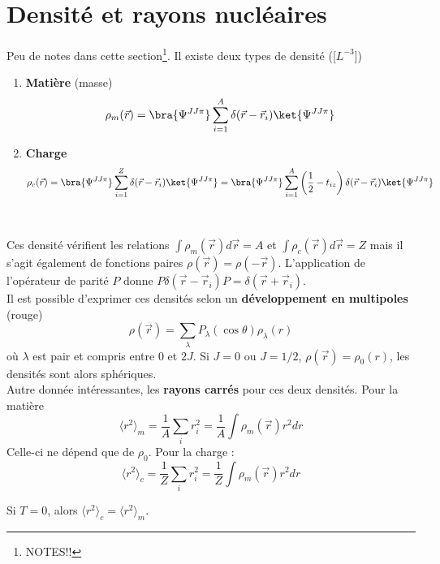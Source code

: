 \newpage
\section{Densité et rayons nucléaires}
Peu de notes dans cette section\footnote{NOTES!!}. Il existe deux types de densité ([$L^{-3}$])
\begin{enumerate}
\item \textbf{Matière} (masse)
\begin{equation}
\rho_m(\vec{r}) = \bra{\Psi^{JJ\pi}}\sum_{i=1}^A\delta(\vec{r}-\vec{r}_i)\ket{\Psi^{JJ\pi}}
\end{equation}
\item \textbf{Charge}
\begin{equation}
\rho_c(\vec{r}) = \bra{\Psi^{JJ\pi}}\sum_{i=1}^Z\delta(\vec{r}-\vec{r}_i)\ket{\Psi^{JJ\pi}} =
\bra{\Psi^{JJ\pi}}\sum_{i=1}^A\left( \frac{1}{2}-t_{iz} \right)\delta(\vec{r}-\vec{r}_i)\ket{\Psi^{JJ\pi}}
\end{equation}
\end{enumerate}\ 

Ces densité vérifient les relations $\int \rho_m(\vec{r})d\vec{r}=A$ et $\int \rho_c(\vec{r})d\vec{r}=Z$ mais
il s'agit également de fonctions paires $\rho(\vec{r})=\rho(-\vec{r})$. L'application de l'opérateur de 
parité $P$ donne $P\delta(\vec{r}-\vec{r}_i)P=\delta(\vec{r}+\vec{r}_i)$.\\

Il est possible d'exprimer ces densités selon un \textbf{développement en multipoles} (rouge)
\begin{equation}
\rho(\vec{r}) = \sum_\lambda P_\lambda(\cos\theta)\rho_\lambda(r)
\end{equation}
où $\lambda$ est pair et compris entre 0 et $2J$. Si $J=0$ ou $J=1/2$, $\rho(\vec{r})=\rho_0(r)$, les densités
sont alors sphériques. \\

Autre donnée intéressantes, les \textbf{rayons carrés} pour ces deux densités. Pour la matière
\begin{equation}
\langle r^2\rangle_m = \frac{1}{A}\sum_i r_i^2 = \frac{1}{A}\int \rho_m(\vec{r})r^2dr
\end{equation}
Celle-ci ne dépend que de $\rho_0$. Pour la charge :
\begin{equation}
\langle r^2\rangle_c = \frac{1}{Z}\sum_i r_i^2 = \frac{1}{Z}\int \rho_m(\vec{r})r^2dr
\end{equation}

Si $T=0$, alors $\langle r^2\rangle_c=\langle r^2\rangle_m$.\\


